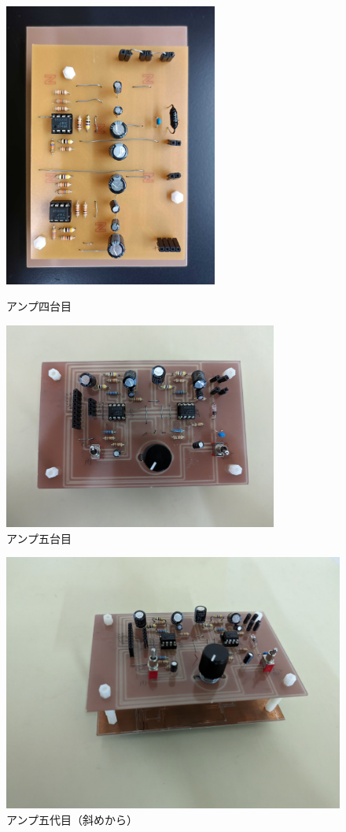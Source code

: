 \documentclass[report.tex]{subfiles}
\begin{document}
\begin{figure}[H]
	\begin{minipage}[b]{0.5\linewidth}
		\centering
		\includegraphics[width=7cm]{use/4.jpg}
		\caption{アンプ四台目}
		\label{fig:s_6}
	\end{minipage}
	\begin{minipage}[b]{0.5\linewidth}
		\centering
		\includegraphics[width=9cm, angle=90]{use/a.jpg}
		\caption{アンプ五台目}
		\label{fig:s_7}
	\end{minipage}
\end{figure}

\begin{figure}
	\centering
	\includegraphics[width=14cm]{use/amp.jpg}
	\caption{アンプ五代目（斜めから）}
	\label{fig:s_8}
\end{figure}
\end{document}
